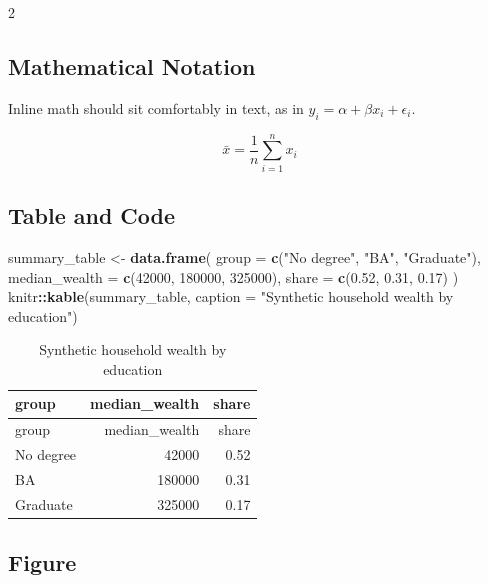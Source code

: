 \documentclass[12pt]{article}
\newenvironment{Shaded}{\begin{snugshade}}{\end{snugshade}}
\newcommand{\AttributeTok}[1]{\textcolor[rgb]{0.13,0.29,0.53}{#1}}
\newcommand{\DecValTok}[1]{\textcolor[rgb]{0.00,0.00,0.81}{#1}}
\newcommand{\FloatTok}[1]{\textcolor[rgb]{0.00,0.00,0.81}{#1}}
\newcommand{\FunctionTok}[1]{\textcolor[rgb]{0.13,0.29,0.53}{\textbf{#1}}}
\newcommand{\NormalTok}[1]{#1}
\newcommand{\OtherTok}[1]{\textcolor[rgb]{0.56,0.35,0.01}{#1}}
\newcommand{\SpecialCharTok}[1]{\textcolor[rgb]{0.81,0.36,0.00}{\textbf{#1}}}
\newcommand{\StringTok}[1]{\textcolor[rgb]{0.31,0.60,0.02}{#1}}
\renewenvironment{Shaded}{%
    \vspace{3pt}%
    \noindent\begin{minipage}{\linewidth}%
    \def\FrameCommand{%
      \hspace{1pt}%
      {\color{hfwgrule}\vrule width 3pt}%
      \hspace{4pt}%
      \colorbox{codeinputbg}%
    }%
    \MakeFramed{\advance\hsize by -\width \FrameRestore}%
    \footnotesize
    \setlength{\parskip}{0pt}%
    \setlength{\partopsep}{0pt}%
  }{%
    \endMakeFramed
    \end{minipage}%
    \vspace{3pt}%
  }
\def\FrameCommand{\fboxsep=4pt\colorbox{codeoutputbg}}%
\begin{document}
\begin{multicols}{2}
\subsection{Mathematical Notation}\label{mathematical-notation}

Inline math should sit comfortably in text, as in
\(y_i = \alpha + \beta x_i + \epsilon_i\).

\[
\bar{x} = \frac{1}{n}\sum_{i=1}^{n} x_i
\]

\subsection{Table and Code}\label{table-and-code}

\begin{Shaded}
\begin{Highlighting}[]
\NormalTok{summary\_table }\OtherTok{\textless{}{-}} \FunctionTok{data.frame}\NormalTok{(}
  \AttributeTok{group =} \FunctionTok{c}\NormalTok{(}\StringTok{"No degree"}\NormalTok{, }\StringTok{"BA"}\NormalTok{, }\StringTok{"Graduate"}\NormalTok{),}
  \AttributeTok{median\_wealth =} \FunctionTok{c}\NormalTok{(}\DecValTok{42000}\NormalTok{, }\DecValTok{180000}\NormalTok{, }\DecValTok{325000}\NormalTok{),}
  \AttributeTok{share =} \FunctionTok{c}\NormalTok{(}\FloatTok{0.52}\NormalTok{, }\FloatTok{0.31}\NormalTok{, }\FloatTok{0.17}\NormalTok{)}
\NormalTok{)}
\NormalTok{knitr}\SpecialCharTok{::}\FunctionTok{kable}\NormalTok{(summary\_table, }\AttributeTok{caption =} \StringTok{"Synthetic household wealth by education"}\NormalTok{)}
\end{Highlighting}
\end{Shaded}

\begin{longtable}[]{@{}lrr@{}}
\caption{Synthetic household wealth by education}\tabularnewline
\toprule\noalign{}
group & median\_wealth & share \\
\midrule\noalign{}
\endfirsthead
\toprule\noalign{}
group & median\_wealth & share \\
\midrule\noalign{}
\endhead
\bottomrule\noalign{}
\endlastfoot
No degree & 42000 & 0.52 \\
BA & 180000 & 0.31 \\
Graduate & 325000 & 0.17 \\
\end{longtable}

\subsection{Figure}\label{figure}


\end{multicols}
\end{document}
